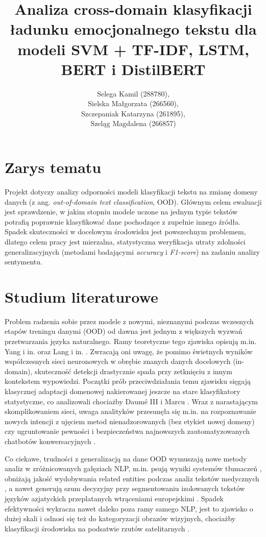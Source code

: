 \documentclass[runningheads]{llncs}
\title{Analiza cross-domain klasyfikacji ładunku emocjonalnego tekstu dla modeli SVM + TF-IDF, LSTM, BERT i DistilBERT}
\author{Selega Kamil (288780),\\ Sielska Małgorzata (266560),\\ Szczepaniak Katarzyna (261895),\\ Szeląg Magdalena (266857)}
\institute{
Politechnika Wrocławska\\
 Wydział Informatyki i Telekomunikacji (W4N)\\
 Kierunek: Zaufane Systemy Sztucznej Inteligencji (TAI) \\
 Kurs: Przetwarzanie Języka Naturalnego
}
\date{}
\begin{document}
\maketitle

\section*{Zarys tematu}
Projekt dotyczy analizy odporności modeli klasyfikacji tekstu na zmianę domeny danych (z ang. \textit{out-of-domain text classification}, OOD). Głównym celem ewaluacji jest sprawdzenie, w jakim stopniu modele uczone na jednym typie tekstów potrafią poprawnie klasyfikować dane pochodzące z zupełnie innego źródła. Spadek skuteczności w docelowym środowisku jest powszechnym problemem, dlatego celem pracy jest mierzalna, statystyczna weryfikacja utraty zdolności generalizacyjnych (metodami badającymi \textit{accuracy} i \textit{F1-score}) na zadaniu analizy sentymentu.

\section*{Studium literaturowe}
Problem radzenia sobie przez modele z nowymi, nieznanymi podczas wczesnych etapów treningu danymi (OOD) od dawna jest jednym z większych wyzwań przetwarzania języka naturalnego. Ramy teoretyczne tego zjawiska opisują m.in. Yang i in. \cite{yang2023outofdistributiongeneralizationtextclassification} oraz Lang i in. \cite{lang2023surveyoutofdistributiondetectionnlp}. Zwracają oni uwagę, że pomimo świetnych wyników współczesnych sieci neuronowych w obrębie znanych danych docelowych (in-domain), skuteczność detekcji drastycznie spada przy zetknięciu z innym kontekstem wypowiedzi. Początki prób przeciwdziałania temu zjawisku sięgają klasycznej adaptacji domenowej nakierowanej jeszcze na stare klasyfikatory statystyczne, co analizowali chociażby Daumé III i Marcu \cite{DBLP:journals/corr/abs-1109-6341}. Wraz z narastającym skomplikowaniem sieci, uwaga analityków przesunęła się m.in. na rozpoznawanie nowych intencji z ujęciem metod nienadzorowanych (bez etykiet nowej domeny) \cite{9741317} czy ugruntowanie pewności i bezpieczeństwa najnowszych zautomatyzowanych chatbotów konwersacyjnych \cite{9052492}. 

Co ciekawe, trudności z generalizacją na dane OOD wymuszają nowe metody analiz w zróżnicowanych gałęziach NLP, m.in. psują wyniki systemów tłumaczeń \cite{haddow-koehn-2012-analysing}, obniżają jakość wydobywania related entities podczas analiz tekstów medycznych \cite{9648338}, a nawet generują szum decyzyjny przy segmentowaniu izolowanych tekstów języków azjatyckich przeplatanych wtrąceniami europejskimi \cite{Limkonchotiwat2021HandlingCA}. Spadek efektywności wykracza nawet daleko poza ramy samego NLP, jest to zjawisko o dużej skali i odnosi się też do kategoryzacji obrazów wizyjnych, chociażby klasyfikacji środowiska na podsatwie rzutów satelitarnych \cite{Kolodner2022EvaluatingDL}. 
\end{document}
